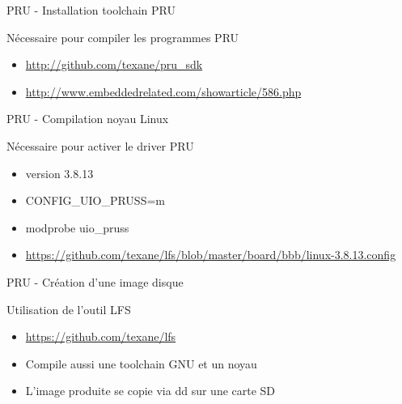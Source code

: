 \documentclass{beamer}
\begin{document}
\begin{frame}{PRU - Installation toolchain PRU}
  \begin{small}
    N\'ecessaire pour compiler les programmes PRU
    \begin{itemize}
    \item \url{http://github.com/texane/pru_sdk}
    \item \url{http://www.embeddedrelated.com/showarticle/586.php}
    \end{itemize}
  \end{small}
\end{frame}


\begin{frame}{PRU - Compilation noyau Linux}
  \begin{small}
    N\'ecessaire pour activer le driver PRU
    \begin{itemize}
    \item version 3.8.13
    \item CONFIG\_UIO\_PRUSS=m
    \item modprobe uio\_pruss
    \item \begin{tiny} \url{https://github.com/texane/lfs/blob/master/board/bbb/linux-3.8.13.config} \end{tiny}
    \end{itemize}
  \end{small}
\end{frame}


\begin{frame}{PRU - Cr\'eation d'une image disque}
  \begin{small}
    Utilisation de l'outil LFS
    \begin{itemize}
    \item \url{https://github.com/texane/lfs}
    \item Compile aussi une toolchain GNU et un noyau
    \item L'image produite se copie via dd sur une carte SD
    \end{itemize}
  \end{small}
\end{frame}
\end{document}
